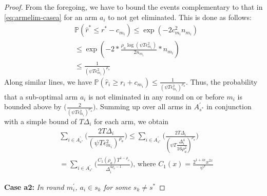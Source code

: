\begin{proof}
From the foregoing, we have to bound the events complementary to that in \eqref{eq:armelim-casea} for an arm $a_i$ to not get eliminated. This is done as follows:
  \begin{align*}
&\mathbb{P}\left(\hat{r}^{*}\leq r^{*} - c_{m_{i}}\right)\leq \exp(-2c_{m_{i}}^{2}n_{m_{i}})\\
&\leq \exp(-2 * \frac{\rho_{a}\log (\psi T\epsilon_{m_{i}}^{2})}{2 n_{m_{i}}} *n_{m_{i}})\\
&\leq \frac{1}{(\psi T\epsilon_{m_{i}}^{2})^{\rho_{a}}}   
  \end{align*}
Along similar lines, we have 
$\mathbb{P}\left(\hat{r}_{i}\geq r_{i} + c_{m_{i}}\right)\leq \frac{1}{(\psi  T\epsilon_{m_{i}}^{2})^{\rho_{a}}}.$
Thus, the probability that a sub-optimal arm $a_{i}$ is not eliminated in any round on or before $m_{i}$ is bounded above by  $\bigg(\frac{2}{(\psi T\epsilon_{m_{i}}^{2})^{\rho_{a}}}\bigg)$. 
 Summing up over all arms in $A_{s^{*}}^{'}$ in conjunction with a simple bound of $T\Delta_{i}$ for each arm, we obtain
   \begin{align*}
&\sum_{i\in A_{s^{*}}^{'}}\bigg(\dfrac{2T\Delta_{i}}{(\psi T\epsilon_{m_{i}}^{2})^{\rho_{a}}}\bigg)
\leq\sum_{i\in A_{s^{*}}^{'}}\bigg(\frac{2T\Delta_{i}}{(\psi T\dfrac{\Delta_{i}^{4}}{16\rho_{a}^{2}})^{\rho_{a}}}\bigg)\\
& =\sum_{i\in A_{s^{*}}^{'}}\bigg(\frac{C_{1}(\rho_{a})T^{1-\rho_{a}}}{\Delta_{i}^{4\rho_{a}-1}}\bigg) \text{, where } C_1(x) = \frac{2^{1+4x}x^{2x}}{\psi^{x}}
   \end{align*}

\textbf{Case a2:} \textit{In round $m_{i}^{'}$, $a_{i} \in s_{k}$ for some $s_k \ne s^*$} %


\end{proof}
